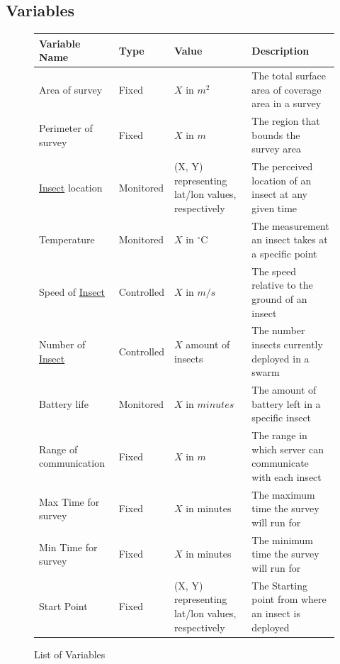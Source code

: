 \documentclass[11pt]{article}
\begin{document}
\subsection{Variables}
\begin{figure}[H]
   \centering
   \noindent\begin{tabularx}{\textwidth}{| >{\centering\arraybackslash}m{} | >{\centering\arraybackslash}m{} | >{\centering\arraybackslash}m{} | >{\centering\arraybackslash}m{} |}
   \hline 
   \textbf{Variable Name} & \textbf{Type} & \textbf{Value} & \textbf{Description} \\
   \hline
   Area of survey & Fixed & $X$ in $m^2$ & The total surface area of coverage area in a survey \\ \hline
   Perimeter of survey & Fixed & $X$ in $m$ & The region that bounds the survey area \\ \hline
   \hyperref[sec:definitions]{Insect} location & Monitored & (X, Y) representing lat/lon values, respectively & The perceived location of an insect at any given time\\ \hline
   Temperature & Monitored & $X$ in $^\circ$C & The measurement an insect takes at a specific point\\ \hline
   Speed of  \hyperref[sec:definitions]{Insect} & Controlled & $X$ in $m/s$  & The speed relative to the ground of an insect \\ \hline
   Number of \hyperref[sec:definitions]{Insect} & Controlled & $X$ amount of insects & The number insects currently deployed in a swarm\\ \hline
   Battery life & Monitored & $X$ in $minutes$ & The amount of battery left in a specific insect \\ \hline
   Range of communication & Fixed & $X$ in $m$ & The range in which server can communicate with each insect \\ \hline
   Max Time for survey & Fixed & $X$ in minutes & The maximum time the survey will run for\\ \hline
   Min Time for survey & Fixed & $X$ in minutes & The minimum time the survey will run for \\ \hline
   Start Point & Fixed & (X, Y) representing lat/lon values, respectively & The Starting point from where an insect is deployed \\ \hline
   \end{tabularx}
   \caption{List of Variables}
\end{figure}
\end{document}
